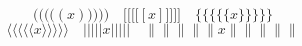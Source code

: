 \[ \Bigg(\bigg(\Big(\big((x)\big)\Big)\bigg)\Bigg)\quad 
\Bigg[\bigg[\Big[\big[[x]\big]\Big]\bigg]\Bigg]\quad 
\Bigg\{\bigg\{\Big\{\big\{\{x\}\big\}\Big\}\bigg\}\Bigg\} 
\]\[ 
\Bigg\langle\bigg\langle\Big\langle\big\langle\langle x 
\rangle\big\rangle\Big\rangle\bigg\rangle\Bigg\rangle\quad
\Bigg\lvert\bigg\lvert\Big\lvert\big\lvert\lvert x 
\rvert\big\rvert\Big\rvert\bigg\rvert\Bigg\rvert\quad
\Bigg\lVert\bigg\lVert\Big\lVert\big\lVert\lVert x 
\rVert\big\rVert\Big\rVert\bigg\rVert\Bigg\rVert \]

